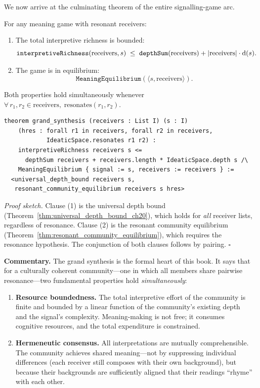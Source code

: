 We now arrive at the culminating theorem of the entire signalling-game arc.

\begin{theorem}
\label{thm:grand_synthesis_ch20}
For any meaning game with resonant receivers:
\begin{enumerate}
  \item[(1)] The total interpretive richness is bounded:
  \[
    \texttt{interpretiveRichness}(\text{receivers}, s) \;\leq\;
    \texttt{depthSum}(\text{receivers}) + |\text{receivers}| \cdot \operatorname{d}(s).
  \]
  \item[(2)] The game is in equilibrium:
  \[
    \texttt{MeaningEquilibrium}(\langle s, \text{receivers} \rangle).
  \]
\end{enumerate}
Both properties hold simultaneously whenever
$\forall\, r_1, r_2 \in \text{receivers},\; \text{resonates}(r_1, r_2)$.
\end{theorem}

\begin{lstlisting}[caption={The grand synthesis in Lean}]
theorem grand_synthesis (receivers : List I) (s : I)
    (hres : forall r1 in receivers, forall r2 in receivers,
            IdeaticSpace.resonates r1 r2) :
    interpretiveRichness receivers s <=
      depthSum receivers + receivers.length * IdeaticSpace.depth s /\
    MeaningEquilibrium { signal := s, receivers := receivers } :=
  <universal_depth_bound receivers s,
   resonant_community_equilibrium receivers s hres>
\end{lstlisting}

\noindent\textit{Proof sketch.}\quad
Clause (1) is the universal depth bound
(Theorem~\ref{thm:universal_depth_bound_ch20}), which holds for \emph{all}
receiver lists, regardless of resonance.  Clause (2) is the resonant
community equilibrium (Theorem~\ref{thm:resonant_community_equilibrium}),
which requires the resonance hypothesis.  The conjunction of both clauses
follows by pairing.
\hfill$\square$

\bigskip

\noindent\textbf{Commentary.}
The grand synthesis is the formal heart of this book.  It says that for a
culturally coherent community---one in which all members share pairwise
resonance---two fundamental properties hold \emph{simultaneously}:

\begin{enumerate}
  \item \textbf{Resource boundedness.}  The total interpretive effort of the
    community is finite and bounded by a linear function of the community's
    existing depth and the signal's complexity.  Meaning-making is not free;
    it consumes cognitive resources, and the total expenditure is
    constrained.

  \item \textbf{Hermeneutic consensus.}  All interpretations are mutually
    comprehensible.  The community achieves shared meaning---not by
    suppressing individual differences (each receiver still composes with
    their own background), but because their backgrounds are sufficiently
    aligned that their readings ``rhyme'' with each other.
\end{enumerate}

